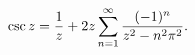 \[\mathop{\csc\/}\nolimits z=\frac{1}{z}+2z\sum_{n=1}^{\infty}\frac{(-1)^{n}}{z^%
{2}-n^{2}\pi^{2}}.\]